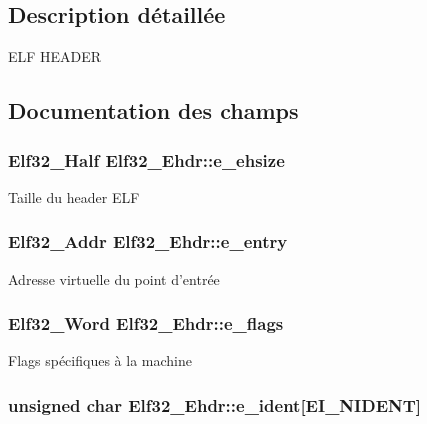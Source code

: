\subsection{Description détaillée}
E\+L\+F H\+E\+A\+D\+E\+R 

\subsection{Documentation des champs}
\hypertarget{structElf32__Ehdr_a04c658023e50479eed64f6d1b00a2504}{
\subsubsection[{e\+\_\+ehsize}]{\setlength{\rightskip}{0pt plus 5cm}Elf32\+\_\+\+Half Elf32\+\_\+\+Ehdr\+::e\+\_\+ehsize}}\label{structElf32__Ehdr_a04c658023e50479eed64f6d1b00a2504}
Taille du header E\+L\+F \hypertarget{structElf32__Ehdr_ab8a982696048d807017919b7d0145482}{
\subsubsection[{e\+\_\+entry}]{\setlength{\rightskip}{0pt plus 5cm}Elf32\+\_\+\+Addr Elf32\+\_\+\+Ehdr\+::e\+\_\+entry}}\label{structElf32__Ehdr_ab8a982696048d807017919b7d0145482}
Adresse virtuelle du point d'entrée \hypertarget{structElf32__Ehdr_a87cf481be7917fafde0c4ecf78c8e574}{
\subsubsection[{e\+\_\+flags}]{\setlength{\rightskip}{0pt plus 5cm}Elf32\+\_\+\+Word Elf32\+\_\+\+Ehdr\+::e\+\_\+flags}}\label{structElf32__Ehdr_a87cf481be7917fafde0c4ecf78c8e574}
Flags spécifiques à la machine \hypertarget{structElf32__Ehdr_aba47ac5e0af02d5668782f1fd5a7466c}{
\subsubsection[{e\+\_\+ident}]{\setlength{\rightskip}{0pt plus 5cm}unsigned char Elf32\+\_\+\+Ehdr\+::e\+\_\+ident\mbox{[}E\+I\+\_\+\+N\+I\+D\+E\+N\+T\mbox{]}}}\label{structElf32__Ehdr_aba47ac5e0af02d5668782f1fd5a7466c}
